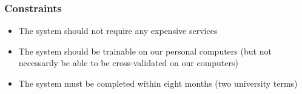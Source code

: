 \subsubsection{Constraints}
\begin{itemize}
\item The system should not require any expensive services
\item The system should be trainable on our personal computers (but not necessarily be able to be cross-validated on our computers)
\item The system must be completed within eight months (two university terms)
\end{itemize}